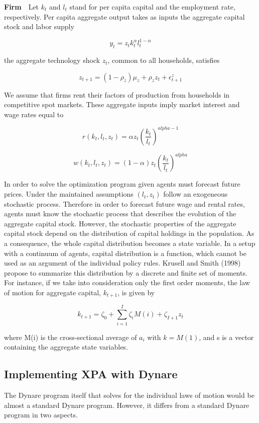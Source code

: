 \documentclass[cn,10pt,math=newtx,citestyle=gb7714-2015,bibstyle=gb7714-2015]{elegantbook}
\begin{document}
	\textbf{Firm}~~Let $k_t$ and $l_t$ stand for per capita capital and the employment rate, respectively. Per capita aggregate output takes as inputs the aggregate capital stock and labor supply
	
	$$y_t=z_tk_t^{\alpha}l_t^{1-\alpha}$$
	
	the aggregate technology shock $z_t$, common to all households, satisfies
	
	$$z_{t+1}=(1-\rho_z)\mu_z+\rho_zz_t+\epsilon_{t+1}^z$$
	
	We assume that firms rent their factors of production from households in competitive spot markets. These aggregate inputs imply market interest and wage rates equal to
	
	$$r(k_t,l_t,z_t)=\alpha z_t\left(\frac{k_t}{l_t}\right)^{alpha-1}$$
	
	$$w(k_t,l_t,z_t)=(1-\alpha)z_t\left(\frac{k_t}{l_t}\right)^{alpha}$$
	
	In order to solve the optimization program given agents must forecast future prices. Under the maintained assumptions $(l_t, z_t)$ follow an exogeneous stochastic process. Therefore in order to forecast future wage and rental rates, agents must know the stochastic process that describes the evolution of the aggregate capital stock. However, the stochastic properties of the aggregate capital stock depend on the distribution of capital holdings in the population. As a consequence, the whole capital distribution becomes a state variable. In a setup with a continuum of agents, capital distribution is a function, which cannot be used as an argument of the individual policy rules. Krusell and Smith (1998) propose to summarize this
	distribution by a discrete and finite set of moments. For instance, if we take into consideration only the first order moments, the law of motion for aggregate capital, $k_{t+1}$, is given by
	
	$$k_{t+1}=\zeta_0+\sum_{i=1}^{I}\zeta_iM(i)+\zeta_{I+1}z_t$$
	
	where M(i) is the cross-sectional average of $a_i$ with $k = M(1)$, and s is a vector containing the aggregate state variables.
	
	
	
	
	\subsection{Implementing XPA with Dynare}
	
	The Dynare program itself that solves for the individual laws of motion would be almost a standard Dynare program. However, it differs from a standard Dynare program in two aspects.
	
\end{document}
